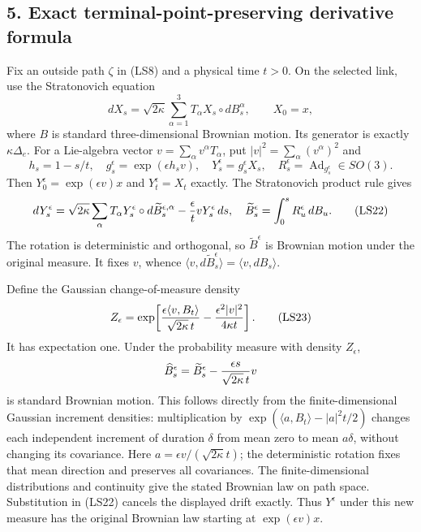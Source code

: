 \documentclass[11pt]{article}
\begin{document}
\subsection*{5. Exact terminal-point-preserving derivative formula}

Fix an outside path \(\zeta\) in (LS8) and a physical time \(t>0\).
On the selected link, use the Stratonovich equation
\[
 dX_s=\sqrt{2\kappa}\sum_{\alpha=1}^3T_\alpha X_s\circ dB_s^\alpha,
 \qquad X_0=x,
 \tag{LS20}
\]
where \(B\) is standard three-dimensional Brownian motion.
Its generator is exactly \(\kappa\Delta_e\).
For a Lie-algebra vector \(v=\sum_\alpha v^\alpha T_\alpha\),
put \(|v|^2=\sum_\alpha(v^\alpha)^2\) and
\[
 h_s=1-s/t,\quad
 g_s^\epsilon=\exp(\epsilon h_s v),\quad
 Y_s^\epsilon=g_s^\epsilon X_s,\quad
 R_s^\epsilon=\operatorname{Ad}_{g_s^\epsilon}\in SO(3).
 \tag{LS21}
\]
Then \(Y_0^\epsilon=\exp(\epsilon v)x\) and
\(Y_t^\epsilon=X_t\) exactly. The Stratonovich product rule gives
\[
 dY_s^\epsilon=
 \sqrt{2\kappa}\sum_\alpha T_\alpha Y_s^\epsilon
                                 \circ d\widetilde B_s^{\epsilon,\alpha}
                  -{\epsilon\over t}vY_s^\epsilon\,ds,
 \quad
 \widetilde B_s^\epsilon=\int_0^sR_u^\epsilon\,dB_u.
 \tag{LS22}
\]
The rotation is deterministic and orthogonal, so
\(\widetilde B^\epsilon\) is Brownian motion under the original
measure. It fixes \(v\), whence
\(\langle v,d\widetilde B_s^\epsilon\rangle
=\langle v,dB_s\rangle\).

Define the Gaussian change-of-measure density
\[
 Z_\epsilon=\exp\!\left[
 {\epsilon\langle v,B_t\rangle\over\sqrt{2\kappa}\,t}
                  -{\epsilon^2|v|^2\over4\kappa t}\right].
 \tag{LS23}
\]
It has expectation one. Under the probability measure with
density \(Z_\epsilon\),
\[
 \widehat B_s^\epsilon
    =\widetilde B_s^\epsilon-
                     {\epsilon s\over\sqrt{2\kappa}\,t}v
 \]
is standard Brownian motion. This follows directly from the
finite-dimensional Gaussian increment densities: multiplication
by \(\exp(\langle a,B_t\rangle-|a|^2t/2)\) changes each independent
increment of duration \(\delta\) from mean zero to mean \(a\delta\),
without changing its covariance. Here
\(a=\epsilon v/(\sqrt{2\kappa}t)\); the deterministic rotation
fixes that mean direction and preserves all covariances. The
finite-dimensional distributions and continuity give the stated
Brownian law on path space.
Substitution in (LS22) cancels the displayed drift exactly.
Thus \(Y^\epsilon\) under this new measure has the original
Brownian law starting at \(\exp(\epsilon v)x\).
\end{document}
